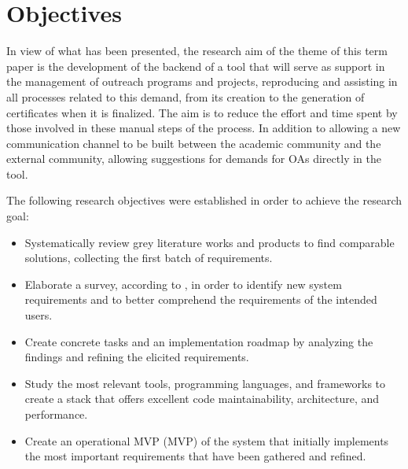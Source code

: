 \section{Objectives}\label{sec:objectives}
% 


In view of what has been presented, the research aim of the theme of this term paper is the development of the backend of a tool that will serve as support in the management of outreach programs and projects, reproducing and assisting in all processes related to this demand, from its creation to the generation of certificates when it is finalized. 
The aim is to reduce the effort and time spent by those involved in these manual steps of the process. 
In addition to allowing a new communication channel to be built between the academic community and the external community, allowing suggestions for demands for \acp{OA} directly in the tool.

The following research objectives were established in order to achieve the research goal:
\begin{itemize}
  \item Systematically review grey literature works and products to find comparable solutions, collecting the first batch of requirements.
  \item Elaborate a survey, according to \textcite{kasunic2005designing}, in order to identify new system requirements and to better comprehend the requirements of the intended users.
  \item Create concrete tasks and an implementation roadmap by analyzing the findings and refining the elicited requirements.
  \item Study the most relevant tools, programming languages, and frameworks to create a stack that offers excellent code maintainability, architecture, and performance.
  \item Create an operational \acl{MVP} (\ac{MVP}) of the system that initially implements the most important requirements that have been gathered and refined.
\end{itemize}

